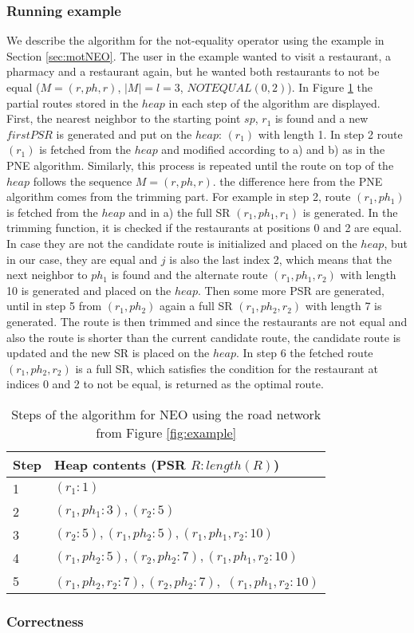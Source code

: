 \subsubsection{Running example}
We describe the algorithm for the not-equality operator using the example in Section \ref{sec:motNEO}. The user in the example wanted to visit a restaurant, a pharmacy and a restaurant again, but he wanted both restaurants to not be equal ($M = (r, ph, r)$, $|M| = l = 3$, $NOTEQUAL(0, 2)$). In Figure \ref{heapNEO} the partial routes stored in the $heap$ in each step of the algorithm are displayed.
First, the nearest neighbor to the starting point $sp$, $r_1$  is found and a new $firstPSR$ is generated and put on the $heap$: $(r_1)$ with length 1. In step 2 route $(r_1)$ is fetched from the $heap$ and modified according to a) and b) as in the PNE algorithm. Similarly, this process is repeated until the route on top of the $heap$ follows the sequence $M = (r, ph, r)$. the difference here from the PNE algorithm comes from the trimming part. For example in step 2, route $(r_1, ph_1)$ is fetched from the $heap$ and in a) the full SR $(r_1, ph_1, r_1)$ is generated. In the trimming function, it is checked if the restaurants at positions 0 and 2 are equal. In case they are not the candidate route is initialized and placed on the $heap$, but in our case, they are equal and $j$ is also the last index 2, which means that the next neighbor to $ph_1$ is found and the alternate route $(r_1, ph_1, r_2)$ with length 10 is generated and placed on the $heap$. Then some more PSR are generated, until in step 5 from $(r_1, ph_2)$ again a full SR $(r_1, ph_2, r_2)$ with length 7 is generated. The route is then trimmed and since the restaurants are not equal and also the route is shorter than the current candidate route, the candidate route is updated and the new SR is placed on the $heap$. In step 6 the fetched route $(r_1, ph_2, r_2)$ is a full SR, which satisfies the condition for the restaurant at indices 0 and 2 to not be equal, is returned as the optimal route.

\begin{table}[h]
	\centering
	\begin{tabular}{ |l|l| } 
		\hline
		Step & Heap contents (PSR $R : length(R)$) \\
		\hline
		1 & $(r_1 : 1)$ \\ 
		 \hline
		2 & $(r_1, ph_1 : 3), (r_2 : 5)$ \\ 
		\hline
		3 & $(r_2 : 5), (r_1, ph_2 : 5), (r_1, ph_1, r_2 : 10)$ \\ 
		\hline
		4 & $(r_1, ph_2 : 5), (r_2, ph_2 : 7), (r_1, ph_1, r_2 : 10)$ \\ 
		\hline
		5 & $(r_1, ph_2, r_2 : 7), (r_2, ph_2 : 7),$ \st{$(r_1, ph_1, r_2 : 10)$} \\ 
		\hline
	\end{tabular}
	\caption{Steps of the algorithm for NEO using the road network from Figure \ref{fig:example}}
	\label{heapNEO}
\end{table}

\subsubsection{Correctness}
\label{sec:correctnessNEO}
